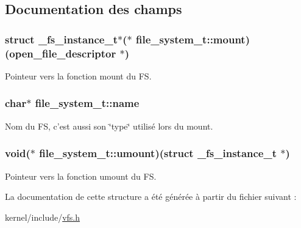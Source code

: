 \subsection{\-Documentation des champs}
\hypertarget{structfile__system__t_a7edaed95e6ac68991bbaac6cd07b458b}{
\subsubsection[{mount}]{\setlength{\rightskip}{0pt plus 5cm}struct {\bf \-\_\-fs\-\_\-instance\-\_\-t}$\ast$($\ast$ {\bf file\-\_\-system\-\_\-t\-::mount})({\bf open\-\_\-file\-\_\-descriptor} $\ast$)}}\label{structfile__system__t_a7edaed95e6ac68991bbaac6cd07b458b}
\-Pointeur vers la fonction mount du \-F\-S. \hypertarget{structfile__system__t_a2b7d7c0f769113d1164052beeeca777d}{
\subsubsection[{name}]{\setlength{\rightskip}{0pt plus 5cm}char$\ast$ {\bf file\-\_\-system\-\_\-t\-::name}}}\label{structfile__system__t_a2b7d7c0f769113d1164052beeeca777d}
\-Nom du \-F\-S, c'est aussi son \char`\"{}type\char`\"{} utilisé lors du mount. \hypertarget{structfile__system__t_a899f34d838d88470373b60f7c5f0edd9}{
\subsubsection[{umount}]{\setlength{\rightskip}{0pt plus 5cm}void($\ast$ {\bf file\-\_\-system\-\_\-t\-::umount})(struct {\bf \-\_\-fs\-\_\-instance\-\_\-t} $\ast$)}}\label{structfile__system__t_a899f34d838d88470373b60f7c5f0edd9}
\-Pointeur vers la fonction umount du \-F\-S. 

\-La documentation de cette structure a été générée à partir du fichier suivant \-:\begin{DoxyCompactItemize}
\item 
kernel/include/\hyperlink{vfs_8h}{vfs.\-h}\end{DoxyCompactItemize}
